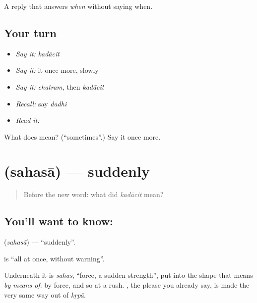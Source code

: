 \begin{grammarlens}[title={What you've built}]
A reply that answers \emph{when} without saying when.
\end{grammarlens}

\subsection*{Your turn}
\begin{itemize}
\raggedright
  \item \emph{Say it:} \emph{kadācit}
  \item \emph{Say it:} it once more, slowly
  \item \emph{Say it:} \emph{chatram}, then \emph{kadācit}
  \item \emph{Recall:} say \emph{dadhi}
  \item \emph{Read it:} \textbf{}
\end{itemize}

\begin{tcolorbox}[breakable,colback=teal!4,colframe=teal!35!black,title={Before you move on}]
What does  mean? (\textquotedblleft{}sometimes\textquotedblright{}.) Say it once more.
\end{tcolorbox}
\section[\texorpdfstring{\sk{सहसा} (sahasā)}{सहसा (sahasā)}]{ (sahasā) — suddenly}

\label{lesson:SA-C42-suddenly}



\begin{quote}
Before the new word: what did \emph{kadācit} mean?
\end{quote}

\subsection*{You'll want to know: }
\textbf{} (\emph{sahasā}) — \textquotedblleft{}suddenly\textquotedblright{}.

\textbf{} is \textquotedblleft{}all at once, without warning\textquotedblright{}.

Underneath it is \emph{sahas}, \textquotedblleft{}force, a sudden strength\textquotedblright{}, put into the shape that means \emph{by means of}: by force, and so at a rush. , the please you already say, is made the very same way out of \emph{kṛpā}.

